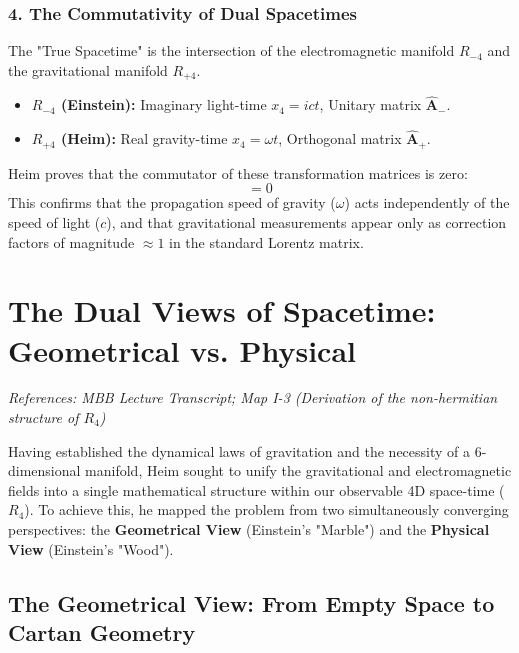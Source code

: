 \documentclass[11pt,a4paper,oneside]{article}
\begin{document}
\subsubsection*{4. The Commutativity of Dual Spacetimes}
The "True Spacetime" is the intersection of the electromagnetic manifold $R_{-4}$ and the gravitational manifold $R_{+4}$.
\begin{itemize}
    \item \textbf{$R_{-4}$ (Einstein):} Imaginary light-time $x_4 = ict$, Unitary matrix $\hat{\mathbf{A}}_{-}$.
    \item \textbf{$R_{+4}$ (Heim):} Real gravity-time $x_4 = \omega t$, Orthogonal matrix $\hat{\mathbf{A}}_{+}$.
\end{itemize}
Heim proves that the commutator of these transformation matrices is zero:
\begin{equation}
    [\hat{\mathbf{A}}_{+}, \hat{\mathbf{A}}_{-}] = 0
\end{equation}
This confirms that the propagation speed of gravity ($\omega$) acts independently of the speed of light ($c$), and that gravitational measurements appear only as correction factors of magnitude $\approx 1$ in the standard Lorentz matrix. 

\section{The Dual Views of Spacetime: Geometrical vs. Physical}
\label{sec:non_hermitian}

\textit{References: MBB Lecture Transcript; Map I-3 (Derivation of the non-hermitian structure of $R_4$)}

Having established the dynamical laws of gravitation and the necessity of a 6-dimensional manifold, Heim sought to unify the gravitational and electromagnetic fields into a single mathematical structure within our observable 4D space-time ($R_4$). To achieve this, he mapped the problem from two simultaneously converging perspectives: the \textbf{Geometrical View} (Einstein’s "Marble") and the \textbf{Physical View} (Einstein’s "Wood").

\subsection{The Geometrical View: From Empty Space to Cartan Geometry}
\end{document}
